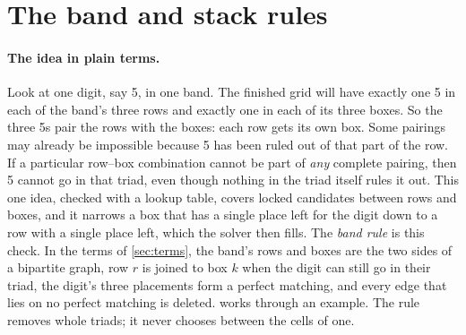 \documentclass[11pt]{article}
\theoremstyle{definition}
\theoremstyle{plain}
\begin{document}
\section{The band and stack rules}
\label{sec:rules}

\paragraph{The idea in plain terms.} Look at one digit, say 5, in one band. The finished grid will have exactly one 5
in each of the band's three rows and exactly one in each of its three boxes. So the three 5s pair the rows with the
boxes: each row gets its own box. Some pairings may already be impossible because 5 has been ruled out of that part of
the row. If a particular row--box combination cannot be part of \emph{any} complete pairing, then 5 cannot go in that
triad, even though nothing in the triad itself rules it out. This one idea, checked with a lookup table,
covers locked candidates between rows and boxes, and it narrows a box that has a single place left for the digit down
to a row with a single place left, which the solver then fills. The \emph{band rule} is this check. In the terms of
\cref{sec:terms}, the band's rows and boxes are the two sides of a bipartite graph, row $r$ is joined to box $k$ when
the digit can still go in their triad, the digit's three placements form a perfect matching, and every edge that lies
on no perfect matching is deleted.  works through an example. The rule removes whole triads; it never
chooses between the cells of one.
\end{document}
